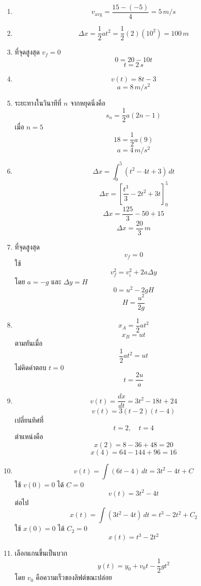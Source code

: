\begin{enumerate}
    \item
    \[
    v_{\text{avg}}=\frac{15-(-5)}{4}=5\,\si{m/s}
    \]

    \item
    \[
    \Delta x=\frac{1}{2}at^2=\frac{1}{2}(2)(10^2)=100\,\si{m}
    \]

    \item
    ที่จุดสูงสุด $v_f=0$
    \[
    0=20-10t
    \]
    \[
    t=2\,\si{s}
    \]

    \item
    \[
    v(t)=8t-3
    \]
    \[
    a=8\,\si{m/s^2}
    \]

    \item
    ระยะทางในวินาทีที่ $n$ จากหยุดนิ่งคือ
    \[
    s_n=\frac{1}{2}a(2n-1)
    \]
    เมื่อ $n=5$
    \[
    18=\frac{1}{2}a(9)
    \]
    \[
    a=4\,\si{m/s^2}
    \]

    \item
    \[
    \Delta x=\int_0^5 (t^2-4t+3)\,dt
    \]
    \[
    \Delta x=\left[\frac{t^3}{3}-2t^2+3t\right]_0^5
    \]
    \[
    \Delta x=\frac{125}{3}-50+15
    \]
    \[
    \Delta x=\frac{20}{3}\,\si{m}
    \]

    \item
    ที่จุดสูงสุด
    \[
    v_f=0
    \]
    ใช้
    \[
    v_f^2=v_i^2+2a\Delta y
    \]
    โดย $a=-g$ และ $\Delta y=H$
    \[
    0=u^2-2gH
    \]
    \[
    H=\frac{u^2}{2g}
    \]

    \item
    \[
    x_A=\frac{1}{2}at^2
    \]
    \[
    x_B=ut
    \]
    ตามทันเมื่อ
    \[
    \frac{1}{2}at^2=ut
    \]
    ไม่คิดคำตอบ $t=0$
    \[
    t=\frac{2u}{a}
    \]

    \item
    \[
    v(t)=\frac{dx}{dt}=3t^2-18t+24
    \]
    \[
    v(t)=3(t-2)(t-4)
    \]
    เปลี่ยนทิศที่
    \[
    t=2,\quad t=4
    \]
    ตำแหน่งคือ
    \[
    x(2)=8-36+48=20
    \]
    \[
    x(4)=64-144+96=16
    \]

    \item
    \[
    v(t)=\int(6t-4)\,dt=3t^2-4t+C
    \]
    ใช้ $v(0)=0$ ได้ $C=0$
    \[
    v(t)=3t^2-4t
    \]
    ต่อไป
    \[
    x(t)=\int(3t^2-4t)\,dt=t^3-2t^2+C_2
    \]
    ใช้ $x(0)=0$ ได้ $C_2=0$
    \[
    x(t)=t^3-2t^2
    \]

    \item
    เลือกแกนขึ้นเป็นบวก
    \[
    y(t)=y_0+v_0t-\frac{1}{2}gt^2
    \]
    โดย $v_0$ คือความเร็วของลิฟต์ขณะปล่อย


\end{enumerate}
